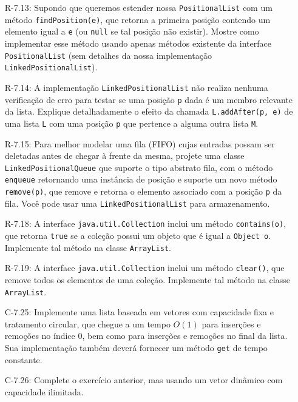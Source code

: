 \begin{enumerate}
\begin{itemize}
		\item[R-7.13:] Supondo que queremos estender nossa \texttt{PositionalList} com um método \texttt{findPosition(e)}, que retorna a primeira posição contendo um elemento igual a \texttt{e} (ou \texttt{null} se tal posição não existir). Mostre como implementar esse método usando apenas métodos existente da interface \texttt{PositionalList} (sem detalhes da nossa implementação \texttt{LinkedPositionalList}).
		
		\item[R-7.14:] A implementação \texttt{LinkedPositionalList} não realiza nenhuma verificação de erro para testar se uma posição \texttt{p} dada é um membro relevante da lista. Explique detalhadamente o efeito da chamada \texttt{L.addAfter(p,\,e)} de uma lista \texttt{L} com uma posição \texttt{p} que pertence a alguma outra lista \texttt{M}.
		
		\item[R-7.15:] Para melhor modelar uma fila (FIFO) cujas entradas possam ser deletadas antes de chegar à frente da mesma, projete uma classe \texttt{LinkedPositionalQueue} que suporte o tipo abstrato fila, com o método \texttt{enqueue} retornando uma instância de posição e suporte um novo método \texttt{remove(p)}, que remove e retorna o elemento associado com a posição \texttt{p} da fila. Você pode usar uma \texttt{LinkedPositionalList} para armazenamento.
		
		\item[R-7.18:] A interface \texttt{java.util.Collection} inclui um método \texttt{contains(o)}, que retorna \texttt{true} se a coleção possui um objeto que é igual a \texttt{Object o}. Implemente tal método na classe \texttt{ArrayList}.
		
		\item[R-7.19:] A interface \texttt{java.util.Collection} inclui um método \texttt{clear()}, que remove todos os elementos de uma coleção. Implemente tal método na classe \texttt{ArrayList}.
		
		\item[C-7.25:] Implemente uma lista baseada em vetores com capacidade fixa e tratamento circular, que chegue a um tempo $O(1)$ para inserções e remoções no índice 0, bem como para inserções e remoções no final da lista. Sua implementação também deverá fornecer um método \texttt{get} de tempo constante.
		
		\item[C-7.26:] Complete o exercício anterior, mas usando um vetor dinâmico com capacidade ilimitada.
		

\end{itemize}
\end{enumerate}
